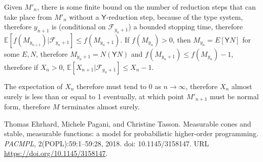 \documentclass{article}
\newcommand{\Y}{\textsf{Y}}
\begin{document}
Given $M'_n$, there is some finite bound on the number of reduction steps that can take place from $M'_n$ without a $\Y$-reduction step, because of the type system, therefore $y_{n+1}$ is (conditional on $\mathcal{F}_{y_n+1}$) a bounded stopping time, therefore $\mathbb{E}[f(M_{y_{n+1}}) | \mathcal{F}_{y_n+1}] \leq f(M_{y_n+1})$. If $f(M_{y_n}) > 0$, then $M_{y_n} = E[\Y N]$ for some $E, N$, therefore $M_{y_n+1} = N (\Y N)$ and $f(M_{y_n+1}) \leq f(M_{y_n}) - 1$, therefore if $X_n > 0$, $\mathbb{E}[X_{n+1} | \mathcal{F}_{y_n+1}] \leq X_n - 1$.

The expectation of $X_n$ therefore must tend to 0 as $n \to \infty$, therefore $X_n$ almost surely is less than or equal to 1 eventually, at which point $M'_{n+1}$ must be normal form, therefore $M$ terminates almost surely.

\begin{thebibliography}{9}
 Thomas Ehrhard, Michele Pagani, and Christine Tasson. Measurable cones and stable, measurable functions: a model for probabilistic higher-order programming. \emph{PACMPL}, 2(POPL):59:1–59:28, 2018. doi: 10.1145/3158147. URL \href{https://doi.org/10.1145/3158147}{https://doi.org/10.1145/3158147}.
\end{thebibliography}
\end{document}
